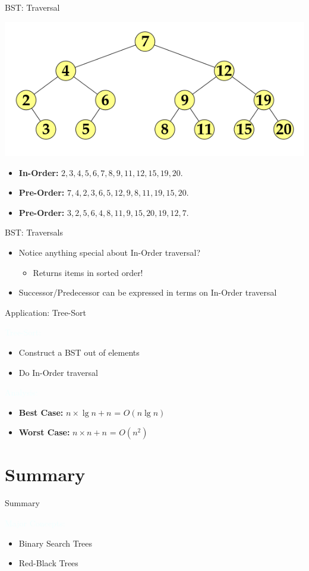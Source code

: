 \documentclass{beamer}
\newcommand{\tblue}[1]{{\Large {\textcolor{azure}{#1}}}}
\begin{document}
\begin{frame}{BST: Traversal}
    \begin{center}
        \includegraphics[scale=0.4]{bstTraversalEg.png}
    \end{center}
    \begin{itemize}
        \item {\bf In-Order:} \pause $2, 3, 4, 5, 6, 7, 8 , 9, 11, 12, 15, 19, 20$.
        \item {\bf Pre-Order:} \pause $7, 4, 2, 3, 6, 5, 12, 9, 8, 11, 19, 15, 20$.
        \item {\bf Pre-Order:} \pause $3, 2, 5, 6, 4, 8, 11, 9, 15, 20, 19, 12, 7$.
    \end{itemize}
\end{frame}


\begin{frame}{BST: Traversals}
    \begin{itemize}
        \item Notice anything special about In-Order traversal? \pause
        \begin{itemize}
            \item Returns items in sorted order!
        \end{itemize}
        \item Successor/Predecessor can be expressed in terms on In-Order traversal
    \end{itemize}
\end{frame}


\begin{frame}{Application: Tree-Sort}

    \tblue{Tree-Sort:}
    \begin{itemize}
        \item Construct a BST out of elements
        \item Do In-Order traversal
    \end{itemize}

    \tblue{Analysis:}
    \begin{itemize}
        \item {\bf Best Case:} \pause $n \times \lg n + n$ = $O(n \lg n)$
        \item {\bf Worst Case:} \pause $n \times n + n$ = $O(n^2)$
    \end{itemize}
\end{frame}


\section{Summary}
\begin{frame}{Summary}

\tblue{Major Concepts:}
\begin{itemize}
\item Binary Search Trees
\item Red-Black Trees
\end{itemize}
\end{frame}
\end{document}
